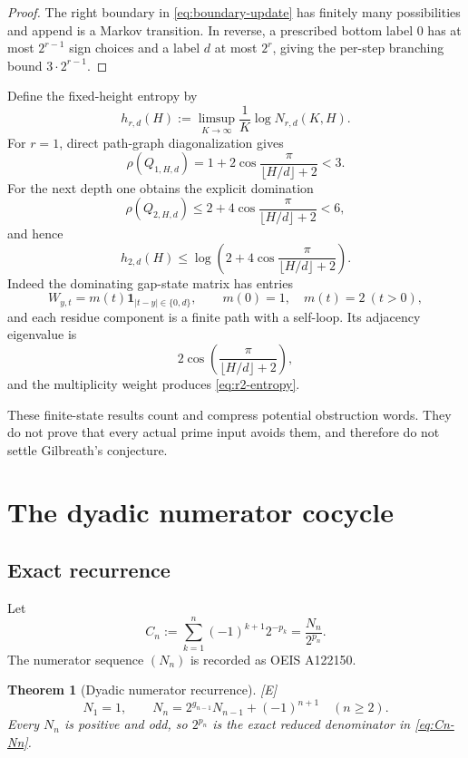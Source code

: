 \documentclass[11pt]{article}
\newtheorem{theorem}{Theorem}[section]
\theoremstyle{definition}
\theoremstyle{remark}
\newcommand{\one}{\mathbf 1}
\newcommand{\status}[1]{\textnormal{\textcolor{accent}{\footnotesize[#1]}}}
\begin{document}
\begin{proof}
The right boundary in \eqref{eq:boundary-update} has finitely many possibilities and
append is a Markov transition.  In reverse, a prescribed bottom label $0$ has at most
$2^{r-1}$ sign choices and a label $d$ at most $2^r$, giving the per-step branching bound
$3\cdot2^{r-1}$.
\end{proof}

Define the fixed-height entropy by
\[
 h_{r,d}(H):=\limsup_{K\to\infty}\frac1K\log N_{r,d}(K,H).
\]
For $r=1$, direct path-graph diagonalization gives
\[
 \rho(Q_{1,H,d})=1+2\cos\frac{\pi}{\lfloor H/d\rfloor+2}<3.
\]
For the next depth one obtains the explicit domination
\begin{equation}\label{eq:r2-entropy}
 \rho(Q_{2,H,d})
 \le2+4\cos\frac{\pi}{\lfloor H/d\rfloor+2}<6,
\end{equation}
and hence
\[
 h_{2,d}(H)\le
 \log\!\left(2+4\cos\frac{\pi}{\lfloor H/d\rfloor+2}\right).
\]
Indeed the dominating gap-state matrix has entries
\[
 W_{y,t}=m(t)\one_{|t-y|\in\{0,d\}},
 \qquad m(0)=1,\quad m(t)=2\ (t>0),
\]
and each residue component is a finite path with a self-loop.  Its adjacency eigenvalue is
\[
 2\cos\!\left(\frac{\pi}{\lfloor H/d\rfloor+2}\right),
\]
and the multiplicity weight produces \eqref{eq:r2-entropy}.

These finite-state results count and compress potential obstruction words.  They do not
prove that every actual prime input avoids them, and therefore do not settle Gilbreath's
conjecture.

\section{The dyadic numerator cocycle}

\subsection{Exact recurrence}

Let
\begin{equation}\label{eq:Cn-Nn}
 C_n:=\sum_{k=1}^{n}(-1)^{k+1}2^{-p_k}
 =\frac{N_n}{2^{p_n}}.
\end{equation}
The numerator sequence $(N_n)$ is recorded as OEIS A122150.

\begin{theorem}[Dyadic numerator recurrence]\label{thm:N-recurrence}
\status{E}
\begin{equation}\label{eq:N-recurrence}
 N_1=1,\qquad
 N_n=2^{g_{n-1}}N_{n-1}+(-1)^{n+1}\quad(n\ge2).
\end{equation}
Every $N_n$ is positive and odd, so $2^{p_n}$ is the exact reduced denominator in
\eqref{eq:Cn-Nn}.
\end{theorem}
\end{document}
